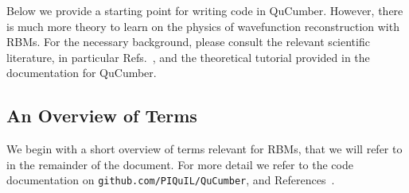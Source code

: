 \documentclass[submission, Phys]{SciPost}
\begin{document}
Below we provide a starting point for writing code in QuCumber.  However, there is much more theory to learn on the physics of wavefunction reconstruction with RBMs. For the necessary background, please consult the relevant scientific literature, in particular Refs.~\cite{Torlai2016thermo, torlai2018tomography, CarleoTroyer2017Science}, and the theoretical tutorial provided in the documentation for QuCumber.  

\subsection{An Overview of Terms}

We begin with a short overview of terms relevant for RBMs, that we will refer to in the remainder of the document.  For more detail we refer to the code documentation on \verb|github.com/PIQuIL/QuCumber|, and References~\cite{hinton2002training, hinton2012practical}.
\end{document}

